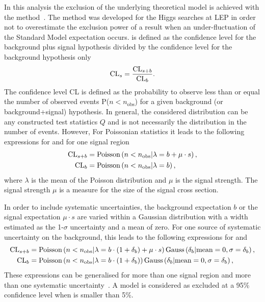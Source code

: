 In this analysis the exclusion of the underlying theoretical model is achieved with the \CLs method~\cite{bib:CLS_1999,bib:CLS_2000,bib:CLS_2002}.
The \CLs method was developed for the Higgs searches at LEP in order not to overestimate the exclusion power of a result when an  under-fluctuation of the Standard Model expectation occurs.
\CLs is defined as the confidence level for the background plus signal hypothesis divided by the confidence level for the background hypothesis only
\begin{equation*}
\text{CL}_{s} = \frac{\text{CL}_{s+b}}{\text{CL}_{b}}.
\end{equation*}
The confidence level CL is defined as the probability to observe less than or equal the number of observed events P($n<n_{\text{obs}}$) for a given background (or background+signal) hypothesis.
In general, the considered distribution can be any constructed test statistics $Q$ and is not necessarily the distribution in the number of events.
However, For Poissonian statistics it leads to the following expressions for \CLsb and \CLb for one signal region
\begin{equation*}
\begin{split}
\text{CL}_{s+b} &= \text{Poisson}\left( n<n_{\text{obs}} |\lambda = b+\mu\cdot s   \right),\\
\text{CL}_{b}  &= \text{Poisson}\left( n<n_{\text{obs}} |\lambda = b   \right),
\end{split}
\end{equation*}
where $\lambda$ is the mean of the Poisson distribution and $\mu$ is the signal strength.
The signal strength $\mu$ is a measure for the size of the signal cross section.

In order to include systematic uncertainties, the background expectation $b$ or the signal expectation $\mu\cdot s$ are varied within a Gaussian distribution with a width estimated as the 1-$\sigma$ uncertainty and a mean of zero.
For one source of systematic uncertainty on the background, this leads to the following expressions for \CLsb and \CLb
\begin{equation*}
\begin{split}
\text{CL}_{s+b} &= \text{Poisson}\left( n<n_{\text{obs}} |\lambda = b \cdot (1+\delta_b)+\mu\cdot s   \right) \text{Gauss}\left(\delta_b|\text{mean}=0, \sigma = \delta_b\right),\\
\text{CL}_{b}  &= \text{Poisson}\left( n<n_{\text{obs}} |\lambda = b \cdot (1+\delta_b)   \right) \text{Gauss}\left(\delta_b|\text{mean}=0, \sigma = \delta_b\right),
\end{split}
\end{equation*}
These expressions can be generalised for more than one signal region and more than one systematic uncertainty~\cite{bib:Ott_Thesis}.
A model is considered as excluded at a 95\% confidence level when \CLs is smaller than 5\%.



